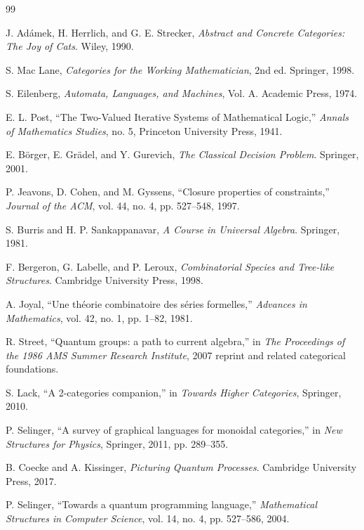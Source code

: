 \documentclass[11pt]{article}
\begin{document}
\begin{thebibliography}{99}

 J. Ad\'{a}mek, H. Herrlich, and G. E. Strecker, \emph{Abstract and Concrete Categories: The Joy of Cats}. Wiley, 1990.

 S. Mac Lane, \emph{Categories for the Working Mathematician}, 2nd ed. Springer, 1998.

 S. Eilenberg, \emph{Automata, Languages, and Machines}, Vol. A. Academic Press, 1974. %

 E. L. Post, ``The Two-Valued Iterative Systems of Mathematical Logic,'' \emph{Annals of Mathematics Studies}, no. 5, Princeton University Press, 1941.

 E. B\"orger, E. Gr\"adel, and Y. Gurevich, \emph{The Classical Decision Problem}. Springer, 2001.

 P. Jeavons, D. Cohen, and M. Gyssens, ``Closure properties of constraints,'' \emph{Journal of the ACM}, vol. 44, no. 4, pp. 527--548, 1997.

 S. Burris and H. P. Sankappanavar, \emph{A Course in Universal Algebra}. Springer, 1981.

 F. Bergeron, G. Labelle, and P. Leroux, \emph{Combinatorial Species and Tree-like Structures}. Cambridge University Press, 1998.

 A. Joyal, ``Une th\'eorie combinatoire des s\'eries formelles,'' \emph{Advances in Mathematics}, vol. 42, no. 1, pp. 1--82, 1981.

 R. Street, ``Quantum groups: a path to current algebra,'' in \emph{The Proceedings of the 1986 AMS Summer Research Institute}, 2007 reprint and related categorical foundations.

 S. Lack, ``A 2-categories companion,'' in \emph{Towards Higher Categories}, Springer, 2010.

 P. Selinger, ``A survey of graphical languages for monoidal categories,'' in \emph{New Structures for Physics}, Springer, 2011, pp. 289--355.

 B. Coecke and A. Kissinger, \emph{Picturing Quantum Processes}. Cambridge University Press, 2017.

 P. Selinger, ``Towards a quantum programming language,'' \emph{Mathematical Structures in Computer Science}, vol. 14, no. 4, pp. 527--586, 2004.


\end{thebibliography}
\end{document}
